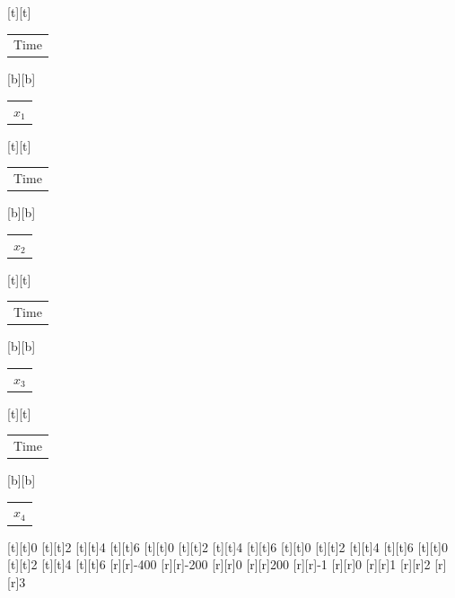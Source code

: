 %    
%
%
\begin{psfrags}%
\psfragscanon%
%
[t][t]{\setlength{\tabcolsep}{0pt}\begin{tabular}{c}Time\end{tabular}}%
[b][b]{\setlength{\tabcolsep}{0pt}\begin{tabular}{c}$x_1$\end{tabular}}%
[t][t]{\setlength{\tabcolsep}{0pt}\begin{tabular}{c}Time\end{tabular}}%
[b][b]{\setlength{\tabcolsep}{0pt}\begin{tabular}{c}$x_2$\end{tabular}}%
[t][t]{\setlength{\tabcolsep}{0pt}\begin{tabular}{c}Time\end{tabular}}%
[b][b]{\setlength{\tabcolsep}{0pt}\begin{tabular}{c}$x_3$\end{tabular}}%
[t][t]{\setlength{\tabcolsep}{0pt}\begin{tabular}{c}Time\end{tabular}}%
[b][b]{\setlength{\tabcolsep}{0pt}\begin{tabular}{c}$x_4$\end{tabular}}%
%
[t][t]{0}%
[t][t]{2}%
[t][t]{4}%
[t][t]{6}%
[t][t]{0}%
[t][t]{2}%
[t][t]{4}%
[t][t]{6}%
[t][t]{0}%
[t][t]{2}%
[t][t]{4}%
[t][t]{6}%
[t][t]{0}%
[t][t]{2}%
[t][t]{4}%
[t][t]{6}%
%
[r][r]{-400}%
[r][r]{-200}%
[r][r]{0}%
[r][r]{200}%
[r][r]{-1}%
[r][r]{0}%
[r][r]{1}%
[r][r]{2}%
[r][r]{3}%

\end{psfrags}
